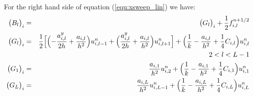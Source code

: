 \documentclass[12pt]{article}
\begin{document}
For the right hand side of equation (\ref{equ:xsweep_lin}) we have:
\begin{eqnarray}
\bigl(B_{l} \bigr)_i &=& \bigl(G_{l} \bigr)_i + \frac{1}{2}f^{n+1/2}_{i,l}\\
\bigl(G_{l} \bigr)_i &=&
\frac{1}{2}\Bigl[
\Bigl(-\frac{a^y_{i,l}}{2h} + \frac{a_{i,l}}{h^2}\Bigr) u^n_{i,l-1} +
\Bigl(\frac{a^y_{i,l}}{2h} + \frac{a_{i,l}}{h^2} \Bigr) u^n_{i,l+1}
\Bigr] + 
\Bigl(\frac{1}{k} - \frac{ a_{i,l}}{h^2} + \frac{1}{4}C_{i,l}\Bigr) u^n_{i,l} \\
 & &2 < l < L-1 \nonumber \\
\bigl(G_{1} \bigr)_i &=& \frac{a_{i,1}}{h^2} u^n_{i,2} + 
\Bigl(\frac{1}{k} - \frac{ a_{i,1}}{h^2} + \frac{1}{4}C_{i,1}\Bigr) u^n_{i,1} \\
\bigl(G_{L} \bigr)_i &=&
\frac{a_{i,L}}{h^2} u^n_{i,L-1} + 
\Bigl(\frac{1}{k} - \frac{ a_{i,L}}{h^2} + \frac{1}{4}C_{i,L}\Bigr) u^n_{i,L}
\end{eqnarray}
\end{document}
